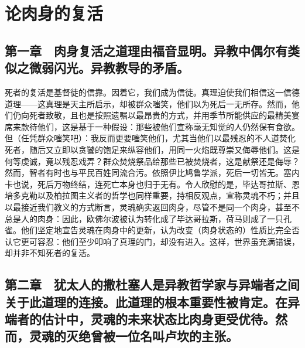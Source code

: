 
\chapter{论肉身的复活}


\par


\section{第一章　肉身复活之道理由福音显明。异教中偶尔有类似之微弱闪光。异教教导的矛盾。}

死者的复活是基督徒的信靠。因着它，我们成为信徒。真理迫使我们相信这一信德道理——这真理是天主所启示，却被群众嗤笑，他们以为死后一无所存。然而，他们仍向死者致敬，且也是按照遗嘱以最昂贵的方式，并用季节所能供应的最精美宴席来款待他们，这是基于一种假设：那些被他们宣称毫无知觉的人仍然保有食欲。但（任凭群众嗤笑吧）：我反而更要嗤笑他们，尤其当他们以最残忍的不人道焚化死者，随后又立即以贪饕的饱足来纵容他们，用同一火焰既尊崇又侮辱他们。这是何等虔诚，竟以残忍戏弄？群众焚烧祭品给那些已被焚烧者，这是献祭还是侮辱？然而，智者有时也与平民百姓同流合污。依照伊比鸠鲁学派，死后一切皆无。塞内卡也说，死后万物终结，连死亡本身也归于无有。令人欣慰的是，毕达哥拉斯、恩培多克勒以及柏拉图主义者的哲学也同样重要，持相反观点，宣称灵魂不朽；并且以最接近我们教义的方式断言，灵魂确实返回肉身，尽管不是同一个肉身，甚至不总是人的肉身：因此，欧佛尔波被认为转化成了毕达哥拉斯，荷马则成了一只孔雀。他们坚定地宣告灵魂在肉身中的更新，认为改变（肉身状态的）性质比完全否认它更可容忍：他们至少叩响了真理的门，却没有进入。这样，世界虽充满错误，却并非不知死者的复活。\par


\section{第二章　犹太人的撒杜塞人是异教哲学家与异端者之间关于此道理的连接。此道理的根本重要性被肯定。在异端者的估计中，灵魂的未来状态比肉身更受优待。然而，灵魂的灭绝曾被一位名叫卢坎的主张。}

